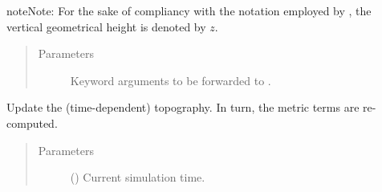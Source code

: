 \documentclass[letterpaper,10pt,english]{sphinxmanual}
\begin{document}
\begin{fulllineitems}
\begin{fulllineitems}
\begin{sphinxadmonition}{note}{Note:}
For the sake of compliancy with the notation employed by ,
the vertical geometrical height is denoted by \(z\).
\end{sphinxadmonition}
\begin{quote}\begin{description}
\item[{Parameters}] \leavevmode
{} \textendash{} Keyword arguments to be forwarded to .

\end{description}\end{quote}

\end{fulllineitems}


\begin{fulllineitems}
\label{\detokenize{api:grids.sigma.Sigma2d.update_topography}}
Update the (time-dependent) topography. In turn, the metric terms are re-computed.
\begin{quote}\begin{description}
\item[{Parameters}] \leavevmode
{} () \textendash{} Current simulation time.

\end{description}\end{quote}

\end{fulllineitems}


\end{fulllineitems}

\end{document}
